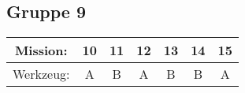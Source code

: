 \documentclass[]{article}
\begin{document}
\subsection*{Gruppe 9}
\begin{tabular}{|c|c|c|c|c|c|c|}
\hline
Mission: & 10 & 11 & 12 & 13 & 14 & 15\\
\hline
Werkzeug: & A & B & A & B & B & A\\
\hline
\end{tabular}
\end{document}
